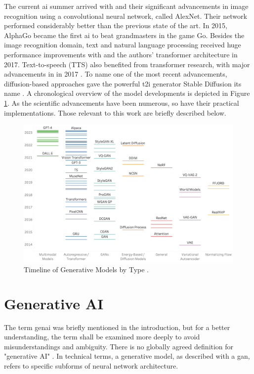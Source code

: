 \documentclass[
  a4paper,  %
  twoside,  %
  bibliography=totoc,
  headsepline,
  cleardoublepage=empty,
  parskip=half,
  draft=false
]{scrbook}
\begin{document}
The current \gls{ai} summer arrived with \citet{krizhevskyImageNetClassificationDeep2012} and their significant advancements in image recognition using a convolutional neural network, called AlexNet. Their network performed considerably better than the previous state of the art. In 2015, AlphaGo became the first \gls{ai} to beat grandmasters in the game Go. Besides the image recognition domain, text and natural language processing received huge performance improvements with  and the authors' transformer architecture in 2017. Text-to-speech (TTS) also benefited from transformer research, with major advancements in  in 2017 \cite{wangTacotronEndtoEndSpeech2017}. To name one of the most recent advancements, diffusion-based approaches gave the powerful \gls{t2i} generator Stable Diffusion its name \cite{rombachHighResolutionImageSynthesis2022}. A chronological overview of the model developments is depicted in Figure \ref{fig:timeline-models}. As the scientific advancements have been numerous, so have their practical implementations. Those relevant to this work are briefly described below.

\begin{figure}[h]
  \centering
  \includegraphics[width=1\textwidth]{./graphics/Timeline_of_generative_models_by_type.png}
  \caption{Timeline of Generative Models by Type \citet{garcia-penalvoWhatWeMean2023}.}
  \label{fig:timeline-models}
\end{figure}

\section{Generative AI}
\label{sec:genai}
The term \gls{genai} was briefly mentioned in the introduction, but for a better understanding, the term shall be examined more deeply to avoid misunderstandings and ambiguity. There is no globally agreed definition for "generative AI" \cite{garcia-penalvoWhatWeMean2023}. In technical terms, a generative model, as described with a \gls{gan}, refers to specific subforms of neural network architecture.
\end{document}
